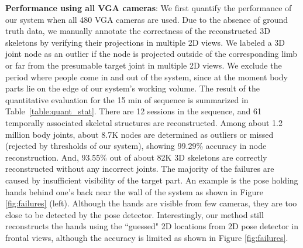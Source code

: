 \textbf{Performance using all VGA cameras}: We first quantify the performance of our system when all 480 VGA cameras are used. Due to the absence of ground truth data, we manually annotate the correctness of the reconstructed 3D skeletons by verifying their projections in multiple 2D views. We labeled a 3D joint node as an outlier if the node is projected outside of the corresponding limb or far from the presumable target joint in multiple 2D views. We exclude the period where people come in and out of the system, since at the moment body parts lie on the edge of our system's working volume. The result of the quantitative evaluation for the 15 min of sequence is summarized in Table~\ref{table:quant_stat}. There are 12 sessions in the sequence, and 61 temporally associated skeletal structures are reconstructed. Among about 1.2 million body joints, about 8.7K nodes are determined as outliers or missed (rejected by thresholds of our system), showing 99.29\% accuracy in node reconstruction. And, 93.55\% out of about 82K 3D skeletons are correctly reconstructed without any incorrect joints. The majority of the failures are caused by insufficient visibility of the target part. An example is the pose holding hands behind one's back near the wall of the system as shown in Figure \ref{fig:failures} (left). Although the hands are visible from few cameras, they are too close to be detected by the pose detector. Interestingly, our method still reconstructs the hands using the ``guessed" 2D locations from 2D pose detector in frontal views, although the accuracy is limited as shown in Figure \ref{fig:failures}.

